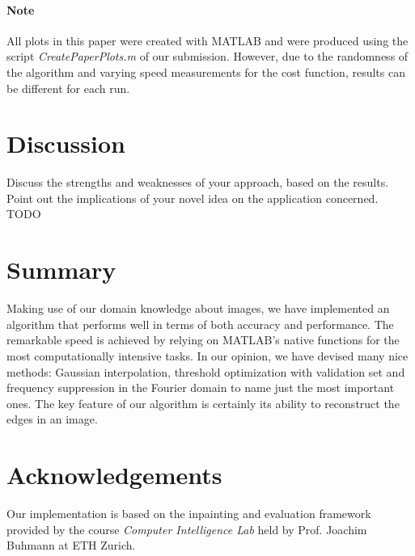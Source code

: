 \documentclass[10pt,conference,compsocconf]{IEEEtran}
\begin{document}
\paragraph{Note} All plots in this paper were created with MATLAB and were produced using the script \emph{CreatePaperPlots.m} of our submission. However, due to the randomness of the algorithm and varying speed measurements for the cost function, results can be different for each run.

\section{Discussion}
Discuss the strengths and weaknesses of your approach, based on the results. Point out the implications of your novel idea on the application concerned. TODO

\section{Summary}
Making use of our domain knowledge about images, we have implemented an algorithm that performs well in terms of both accuracy and performance. The remarkable speed is achieved by relying on MATLAB's native functions for the most computationally intensive tasks. In our opinion, we have devised many nice methods: Gaussian interpolation, threshold optimization with validation set and frequency suppression in the Fourier domain to name just the most important ones. The key feature of our algorithm is certainly its ability to reconstruct the edges in an image.

\section*{Acknowledgements}
Our implementation is based on the inpainting and evaluation framework provided by the course \emph{Computer Intelligence Lab} held by Prof. Joachim Buhmann at ETH Zurich.



\end{document}
